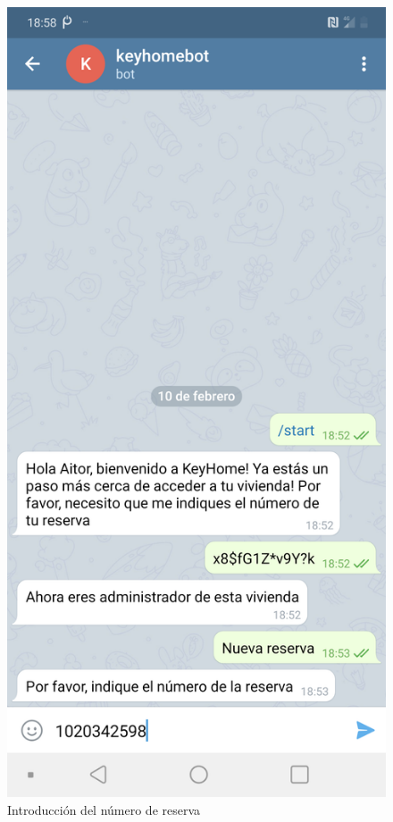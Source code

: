 \begin{figure}[tbp]
\centering
\includegraphics[scale = 0.15]{fig/Numero-de-reserva.png}
\caption{Introducción del número de reserva}
\label{fig:introduccion-del-numero-de-reserva}
\end{figure}

